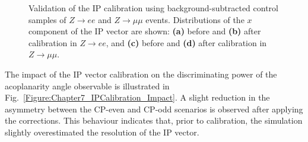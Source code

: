 \begin{figure}[!htbp]
\begin{subfigure}[b]{0.49\textwidth}
            \caption{}
        \end{subfigure}
    \caption[Validation of the IP calibration in $Z\to ee$ and $Z\to\mu\mu$ events.]
    {Validation of the \ac{IP} calibration using background-subtracted control samples of $Z\to ee$ and $Z\to\mu\mu$ events. 
    Distributions of the $x$ component of the IP vector are shown: \textbf{(a)} before and \textbf{(b)} after calibration in $Z\to ee$, 
    and \textbf{(c)} before and \textbf{(d)} after calibration in $Z\to\mu\mu$. }

    \label{Figure:IPvector_Corrections}
\end{figure}

The impact of the \ac{IP} vector calibration on the discriminating power of the acoplanarity angle observable is illustrated in Fig.~\ref{Figure:Chapter7_IPCalibration_Impact}. A slight reduction in the asymmetry between the CP-even and CP-odd scenarios is observed after applying the corrections. This behaviour indicates that, prior to calibration, the simulation slightly overestimated the resolution of the \ac{IP} vector.


